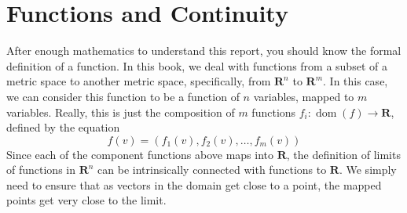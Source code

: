 \documentclass[12pt]{amsbook}
\theoremstyle{plain}
\theoremstyle{definition}
\DeclareMathOperator{\dom}{dom}
\begin{document}
\chapter{Functions and Continuity}

After enough mathematics to understand this report, you should know the formal definition of a function. In this book, we deal with functions from a subset of a metric space to another metric space, specifically, from $\mathbf{R}^n$ to $\mathbf{R}^m$. In this case, we can consider this function to be a function of $n$ variables, mapped to $m$ variables. Really, this is just the composition of $m$ functions $f_i:\dom(f) \to \mathbf{R}$, defined by the equation
%
\[ f(v) = (f_1(v), f_2(v), \dots, f_m(v)) \]
%
Since each of the component functions above maps into $\mathbf{R}$, the definition of limits of functions in $\mathbf{R}^n$ can be intrinsically connected with functions to $\mathbf{R}$. We simply need to ensure that as vectors in the domain get close to a point, the mapped points get very close to the limit.
\end{document}
